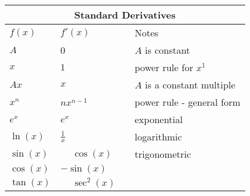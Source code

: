 \begin{center}
	\renewcommand{\arraystretch}{1.2}
		\begin{tabular}{llll}	
			\toprule
			\multicolumn{4}{c}{Standard Derivatives}\\\midrule
			$f(x)$ & $f'(x)$  &&Notes\\ \midrule
			$A$&0&&$A$ is constant\\ 
			$x$&$1$&&power rule for $x^1$\\ 
			$Ax$&$x$&&$A$ is a constant multiple\\ \midrule
			$x^n$ & $nx^{n-1}$ &&power rule - general form\\ 
			$e^x$ & $e^x$  && exponential\\ 
			$\ln(x)$ & $\frac{1}{x}$ &&logarithmic\\ \midrule
			$\sin(x)$ & $\phantom{-}\cos(x)$  &&trigonometric \\ 
			$\cos(x)$ & $-\sin(x)$ && \\ 
			$\tan(x)$ & $\phantom{-}\sec^2(x)$ && \\ \bottomrule
		\end{tabular}
	\end{center}
